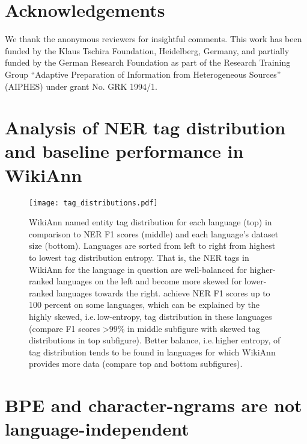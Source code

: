 \documentclass[11pt,a4paper]{article}
\begin{document}
\section{Acknowledgements}
We thank the anonymous reviewers for insightful comments.
This work has been funded by the Klaus Tschira Foundation, Heidelberg, Germany,
and partially funded by the German Research Foundation as part of the Research Training Group ``Adaptive Preparation of Information from Heterogeneous Sources'' (AIPHES) under grant No. GRK 1994/1. 




\newpage
\onecolumn
\twocolumn

\appendix

\newpage
\onecolumn
\section{Analysis of NER tag distribution and baseline performance in WikiAnn}
\label{sec:analysis-wikiann}
\begin{figure}[h!]
	\centering
	\texttt{[image: tag\_distributions.pdf]}
	\caption{WikiAnn named entity tag distribution for each language (top) in comparison to \citeauthor{pan2017crosslingual} NER F1 scores (middle) and each language's dataset size (bottom).
Languages are sorted from left to right from highest to lowest tag distribution entropy.
That is, the NER tags in WikiAnn for the language in question are well-balanced for higher-ranked languages on the left and become more skewed for lower-ranked languages towards the right.
\citeauthor{pan2017crosslingual} achieve NER F1 scores up to 100 percent on some languages, which can be explained by the highly skewed, i.e.\,low-entropy, tag distribution in these languages (compare F1 scores \textgreater99\% in middle subfigure with skewed tag distributions in top subfigure). Better balance, i.e.\,higher entropy, of tag distribution tends to be found in languages for which WikiAnn provides more data (compare top and bottom subfigures).}
	\label{fig:tag-distributions}
\end{figure}

\newpage
\onecolumn
\twocolumn

\section{BPE and character-ngrams are not language-independent}
\label{app:language-independence}
\end{document}
